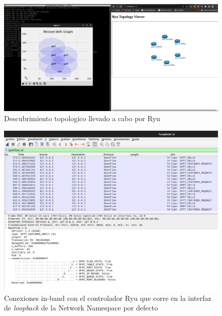\begin{figure}[ht!]
    \centering
    \includegraphics[width=\textwidth]{archivos/img/dev/inband1.png}
    \caption{Descubrimiento topologico llevado a cabo por Ryu}
    \label{fig:inband1}
\end{figure}

\begin{figure}[ht!]
    \centering
    \includegraphics[width=\textwidth]{archivos/img/dev/inband2.png}
    \caption{Conexiones in-band con el controlador Ryu que corre en la interfaz de \textit{loopback} de la Network Namespace por defecto}
    \label{fig:inband2}
\end{figure}


